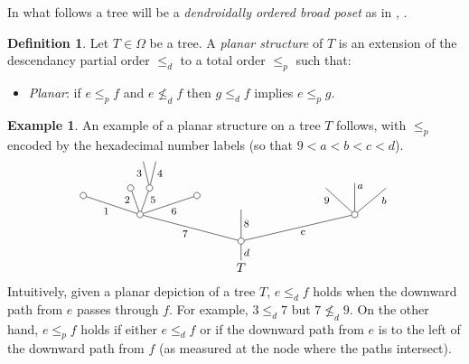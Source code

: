 \documentclass[a4paper,10pt
,draft
]{article}%
\numberwithin{equation}{section}
\numberwithin{figure}{section}
\theoremstyle{definition} %
\newtheorem{definition}[equation]{Definition}%
\newtheorem{example}[equation]{Example}%
\newcommand{\1}{\ensuremath{\mathbbm 1}}%
\begin{document}
In what follows a tree will be a 
\textit{dendroidally ordered broad poset}
as in \cite{We12}, \cite[Def. 5.9]{Pe17}.


\begin{definition}\label{PLANARIZE DEF}
	Let $T \in \Omega$ be a tree. A \textit{planar structure} of $T$ is an extension of the descendancy partial order $\leq_d$ to a total order $\leq_p$ such that: 
	\begin{itemize}
		\item \textit{Planar}: if $e \leq_p f$ and $e \nleq_d f$ then 
		$g \leq_d f$ implies $e \leq_p g$.
	\end{itemize} 
\end{definition}


\begin{example}\label{PLANAREX EX}
An example of a planar structure on a tree $T$ follows, with $\leq_p$ encoded by the hexadecimal number labels
(so that $9<a<b<c<d$).
\[
	\begin{tikzpicture}[grow=up,auto,level distance=2.1em,
	every node/.style = {font=\footnotesize,inner sep=2pt},
	dummy/.style={circle,draw,inner sep=0pt,minimum size=1.75mm}]
		\node[font=\normalsize] at (0,0) {$T$}
			child{node [dummy] {}
				child[sibling distance = 9em]{node [dummy] {}
					child[sibling distance = 2.5em]{
					edge from parent node [near end,swap] {$b$}}
					child[level distance=2.5em]{
					edge from parent node [very near end,swap] {$a$}}				
					child[sibling distance = 2.3em]{
					edge from parent node [near end] {$9$}}
				edge from parent node [swap] {c}}
				child[level distance =2.5em]{
				edge from parent node [swap] {$8$}}
				child[sibling distance = 8em]{node [dummy] {}
					child[sibling distance =3em, level distance = 1.5 em]{node [dummy] {}
					edge from parent node [swap] {$6$}}
					child[sibling distance = 1.5em]{node [dummy] {}
						child[sibling distance =1em]{
						edge from parent node [swap,near end] {$4$}}
						child[sibling distance =1em]{
						edge from parent node [near end] {$3$}}
					edge from parent node [very near end,swap] {$5$}}
					child[sibling distance =1.5em]{node [dummy] {}
					edge from parent node [very near end] {$2$}}
					child[sibling distance =3em,level distance =1.5em]{node [dummy] {}
					edge from parent node {$1$}}
				edge from parent node {$7$}}
			edge from parent node [swap] {$d$}};
	\end{tikzpicture}
\]
Intuitively, given a planar depiction of a tree $T$, $e \leq_d f$ holds when the downward path from $e$ passes through $f$.
For example, $3 \leq_d 7$ but $7 \not \leq_d 9$.
On the other hand, $e \leq_p f$ holds if either
$e \leq_d f$ or if the downward path from $e$ is to the left of the downward path from $f$ (as measured at the node where the paths intersect).


\end{example}
\end{document}
